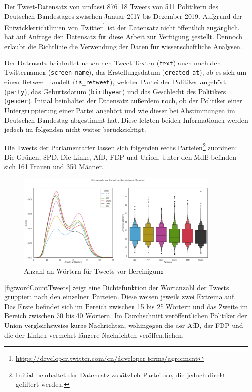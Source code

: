 Der Tweet-Datensatz von \textcite{saltzer_finding_2022} umfasst \num{876118} Tweets von \num{511} Politikern des Deutschen Bundestages zwischen Januar \num{2017} bis Dezember \num{2019}. Aufgrund der Entwicklerrichtlinien von Twitter\footnote{\href{https://developer.twitter.com/en/developer-terms/agreement}{https://developer.twitter.com/en/developer-terms/agreement}} ist der Datensatz nicht öffentlich zugänglich. \textcite{saltzer_finding_2022} hat auf Anfrage den Datensatz für diese Arbeit zur Verfügung gestellt. Dennoch erlaubt die Richtlinie die Verwendung der Daten für wissenschaftliche Analysen.

Der Datensatz beinhaltet neben den Tweet-Texten (\texttt{text}) auch noch den Twitternamen (\texttt{screen\_name}), das Erstellungsdatum (\texttt{created\_at}), ob es sich um einen Retweet handelt (\texttt{is\_retweet}), welcher Partei der Politiker angehört (\texttt{party}), das Geburtsdatum (\texttt{birthyear}) und das Geschlecht des Politikers (\texttt{gender}). Initial beinhaltet der Datensatz außerdem noch, ob der Politiker einer Untergruppierung einer Partei angehört und wie dieser bei Abstimmungen im Deutschen Bundestag abgestimmt hat. Diese letzten beiden Informationen werden jedoch im folgenden nicht weiter berücksichtigt.

Die Tweets der Parlamentarier lassen sich folgenden sechs Parteien\footnote{Initial beinhaltet der Datensatz zusätzlich Parteilose, die jedoch direkt gefiltert werden.} zuordnen: Die Grünen, \ac{SPD}, Die Linke, \ac{AfD}, \ac{FDP} und Union. Unter den \ac{MdB} befinden sich \num{161} Frauen und \num{350} Männer.

\begin{figure}[H]
    \centering
    \includegraphics[width=0.9\textwidth]{data/images/tweets/wortanzahl_pro_partei_vor_bereinigung.png}
    \caption{Anzahl an Wörtern für Tweets vor Bereinigung} \label{fig:wordCountTweets}
\end{figure}

\autoref{fig:wordCountTweets} zeigt eine Dichtefunktion der Wortanzahl der Tweets gruppiert nach den einzelnen Parteien. Diese weisen jeweils zwei Extrema auf. Das Erste befindet sich im Bereich zwischen \num{15} bis \num{25} Wörtern und das Zweite im Bereich zwischen \num{30} bis \num{40} Wörtern. Im Durchschnitt veröffentlichen Politiker der Union vergleichsweise kurze Nachrichten, wohingegen die der \ac{AfD}, der \ac{FDP} und die der Linken vermehrt längere Nachrichten veröffentlichen.

